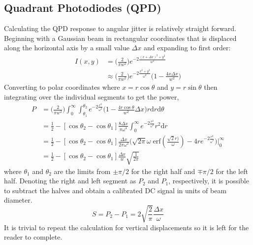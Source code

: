 \begin{appendices}
	\section{Quadrant Photodiodes (QPD)}
	Calculating the QPD response to angular jitter is relatively straight forward. Beginning with a Gaussian beam in rectangular coordinates that is displaced along the horizontal axis by a small value $\Delta x$ and expanding to first order:
	\begin{equation}
	\begin{split}\label{gauss_intensity_yaw}
	I(x,y) 	&= 			\bigg(\frac{2}{\pi w^2}\bigg) e^{-2 \frac{(x+\Delta x)^2 + y^2}{w^2}}\\
			&\approx	\bigg(\frac{2}{\pi w^2}\bigg) e^{-2 \frac{x^2 + y^2}{\omega^2}}  \bigg(1-\frac{4 x \Delta x}{w^2}\bigg)
	\end{split}
	\end{equation}
	Converting to polar coordinates where $x=r\cos \theta$ and $y=r \sin \theta$ then integrating over the individual segments to get the power,
	\begin{equation}
	\begin{split}
	P 	&=  \bigg(\frac{2}{\pi w^2}\bigg) \int_{0}^{\infty} \int_{\theta_1}^{\theta_2} e^{-2 \frac{r^2}{\omega^2}}  \bigg(1-\frac{4 r \cos \theta}{w^2}\Delta x\bigg) r \text{d}r \text{d} \theta\\
		&= \frac{1}{2} - [\cos \theta_2 - \cos \theta_1] \frac{8 \Delta x }{\pi \omega^4}\int_{0}^{\infty} e^{-2\frac{r^2}{\omega^2}} r^2 \text{d}r\\
		&= \frac{1}{2} - [\cos \theta_2 - \cos \theta_1] \frac{\Delta x }{2\pi \omega^2} \bigg(\sqrt{2\pi} \omega \; \text{erf}(\frac{\sqrt{2}r)}{\omega}) - 4 r e^{-2 \frac{r^2}{\omega^2}} \bigg) \bigg\vert^\infty_0\\
		&= \frac{1}{2} - [\cos \theta_2 - \cos \theta_1] \frac{\Delta x}{w} \sqrt{\frac{1}{2\pi}}
	\end{split}
	\end{equation}
	where $\theta_1$ and $\theta_2$ are the limits from $\pm \pi/2$ for the right half and $\mp \pi/2$ for the left half.  Denoting the right and left segment as $P_2$ and $P_1$, respectively, it is possible to subtract the halves and obtain a calibrated DC signal in units of beam diameter.
	\begin{equation}
	S = P_2 - P_1 = 2\sqrt{\frac{2}{\pi}} \frac{\Delta x}{\omega}
	\end{equation}
	It is trivial to repeat the calculation for vertical displacements so it is left for the reader to complete.
	

\end{appendices}
